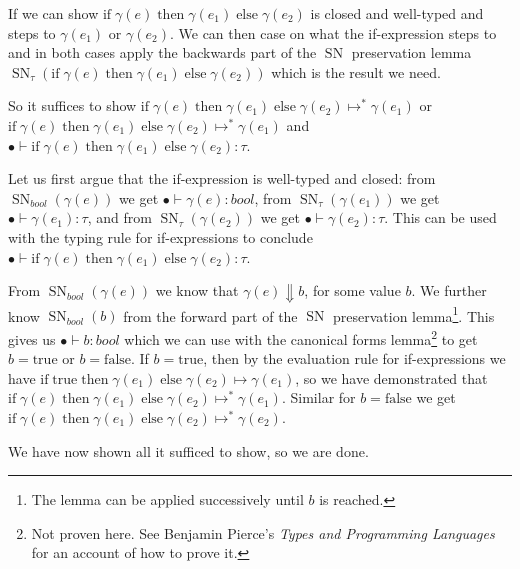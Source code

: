\documentclass[a4paper,10pt,fleqn]{article}
\DeclareMathOperator{\SNPred}{SN}
\newcommand{\evalto}{\ensuremath{\mapsto}}
\newcommand{\evaltos}[1][*]{\ensuremath{\evalto^{#1}}}
\newcommand{\mtenv}{\ensuremath{\bullet}}
\newcommand{\eif}[3]{\ensuremath{ \text{if}\; #1 \; \text{then} \; #2 \; \text{else} \; #3}}
\newcommand{\true}{\ensuremath{\text{true}}}
\newcommand{\false}{\ensuremath{\text{false}}}
\newcommand{\SN}[2]{\ensuremath{\SNPred_{#1}(#2)}}
\begin{document}
If we can show $\eif{\gamma(e)}{\gamma(e_1)}{\gamma(e_2)}$ is closed and well-typed and steps to $\gamma(e_1)$ or $\gamma(e_2)$. We can then case on what the if-expression steps to and in both cases apply the backwards part of the $\SNPred$ preservation lemma $\SN{\tau}{\eif{\gamma(e)}{\gamma(e_1)}{\gamma(e_2)}}$ which is the result we need.

So it suffices to show $\eif{\gamma(e)}{\gamma(e_1)}{\gamma(e_2)} \evaltos \gamma(e_1)$ or $\eif{\gamma(e)}{\gamma(e_1)}{\gamma(e_2)} \evaltos \gamma(e_1)$ and $\mtenv \vdash \eif{\gamma(e)}{\gamma(e_1)}{\gamma(e_2)} : \tau$. 

Let us first argue that the if-expression is well-typed and closed: from $\SN{bool}{\gamma(e)}$ we get $\mtenv \vdash \gamma(e) : bool$, from $\SN{\tau}{\gamma(e_1)}$ we get $\mtenv \vdash \gamma(e_1) : \tau$, and from $\SN{\tau}{\gamma(e_2)}$ we get $\mtenv \vdash \gamma(e_2) : \tau$. This can be used with the typing rule for if-expressions to conclude $\mtenv \vdash \eif{\gamma(e)}{\gamma(e_1)}{\gamma(e_2)} : \tau$.

From $\SN{bool}{\gamma(e)}$ we know that $\gamma(e) \Downarrow b$, for some value $b$. We further know $\SN{bool}{b}$ from the forward part of the $\SNPred$ preservation lemma\footnote{The lemma can be applied successively until $b$ is reached.}. This gives us $\mtenv \vdash b : bool$ which we can use with the canonical forms lemma\footnote{Not proven here. See Benjamin Pierce's \emph{Types and Programming Languages} for an account of how to prove it.} to get $b=\true$ or $b=\false$. If $b=\true$, then by the evaluation rule for if-expressions we have $\eif{\true}{\gamma(e_1)}{\gamma(e_2)} \evalto \gamma(e_1)$, so we have demonstrated that $\eif{\gamma(e)}{\gamma(e_1)}{\gamma(e_2)} \evaltos \gamma(e_1)$. Similar for $b = \false$ we get $\eif{\gamma(e)}{\gamma(e_1)}{\gamma(e_2)} \evaltos \gamma(e_2)$.

We have now shown all it sufficed to show, so we are done.
\end{document}
